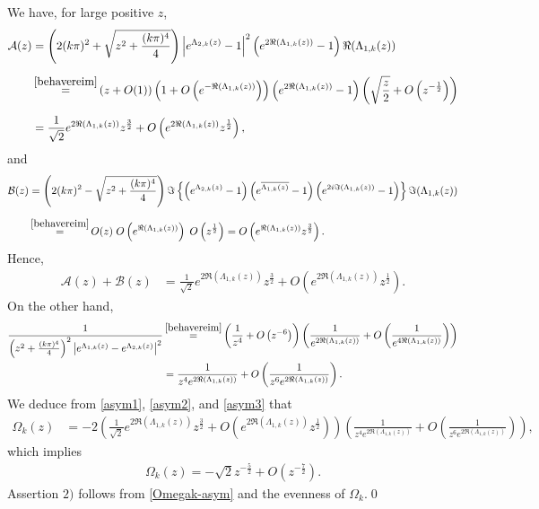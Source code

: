 \documentclass[11pt, reqno]{amsart}
\theoremstyle{plain}
\numberwithin{equation}{section}
\begin{document}
We have, for large positive $z$, 
\begin{align*}
	\mathcal{A}(z) &=  \left(2(k \pi)^2 + \sqrt{z^2 + \frac{(k \pi)^4}{4} }\right) \left|e^{\Lambda_{2,k}(z)} - 1 \right|^2 \left(e^{2\Re (\Lambda_{1,k}(z))} - 1 \right) \Re (\Lambda_{1,k}(z)) \\[6pt]
	& \mathop{=}^{\eqref{behavereim}}  \left(z + O(1) \right) \left(1 + O \left(e^{-\Re (\Lambda_{1,k}(z))} \right) \right) \left(e^{2\Re (\Lambda_{1,k}(z))} - 1 \right) \left(\sqrt{\frac{z}{2}} + O \left(z^{-\frac{1}{2}} \right) \right) \\[6pt]
	&= \frac{1}{\sqrt{2}} e^{2\Re (\Lambda_{1,k}(z))} z^{\frac{3}{2}} + O\left(e^{2\Re (\Lambda_{1,k}(z))} z^{\frac{1}{2}} \right), 
\end{align*}
and 
\begin{align*}
	\mathcal{B}(z) &= \left(2(k \pi)^2 - \sqrt{z^2 + \frac{(k \pi)^4}{4} } \right) \Im \left\{ \left(e^{\Lambda_{2,k}(z)} - 1 \right) \left( e^{\overline{\Lambda_{1,k}(z)}} - 1 \right) \left(e^{2 i \Im (\Lambda_{1,k}(z))} - 1 \right) \right\} \Im (\Lambda_{1,k}(z)) \\[6pt]
	& \mathop{=}^{\eqref{behavereim}}  O(z) \; O\left(e^{\Re(\Lambda_{1,k}(z))} \right) \; O \left(z^{\frac{1}{2}} \right)  = O \left(e^{\Re (\Lambda_{1,k}(z))} z^{\frac{3}{2}} \right).
\end{align*}
Hence,
\begin{align}
	\mathcal{A}(z) + \mathcal{B}(z) &=  \frac{1}{\sqrt{2}} e^{2\Re (\Lambda_{1,k}(z))} z^{\frac{3}{2}} + O\left(e^{2\Re (\Lambda_{1,k}(z))} z^{\frac{1}{2}} \right).	\label{asym2}
\end{align} 
On the other hand, 
\begin{align}
\frac{1}{\left(z^2 + \frac{(k \pi)^4}{4} \right)^2 \left|e^{\Lambda_{1,k}(z)} - e^{\Lambda_{2,k}(z)} \right|^2} & \mathop{=}^{\eqref{behavereim}}  \left(\frac{1}{z^4} + O \left(z^{-6} \right) \right) \left(\frac{1}{e^{2\Re (\Lambda_{1,k}(z))}} + O \left(\frac{1}{e^{4\Re(\Lambda_{1,k}(z))}} \right) \right) \nonumber \\
&= \frac{1}{z^4 e^{2\Re (\Lambda_{1,k}(z))}} + O \left(\frac{1}{z^6 e^{2\Re (\Lambda_{1,k}(z))}} \right).	\label{asym3}
\end{align}
We deduce from \eqref{asym1}, \eqref{asym2}, and \eqref{asym3} that 
\begin{align*}
	\Omega_k(z) &= -2 \left(\frac{1}{\sqrt{2}} e^{2\Re (\Lambda_{1,k}(z))} z^{\frac{3}{2}} + O \left(e^{2\Re (\Lambda_{1,k}(z))} z^{\frac{1}{2}} \right) \right) \left(\frac{1}{z^4 e^{2\Re (\Lambda_{1,k}(z))}} + O \left(\frac{1}{z^6 e^{2\Re (\Lambda_{1,k}(z))}} \right) \right),
\end{align*}
which implies
\begin{align}	\label{Omegak-asym}
	\Omega_k(z) = -\sqrt{2} z^{-\frac{5}{2}} + O(z^{-\frac{7}{2}}).
\end{align}  
Assertion $2)$ follows from \eqref{Omegak-asym} and the evenness of $\Omega_k$.\qed
\end{document}
